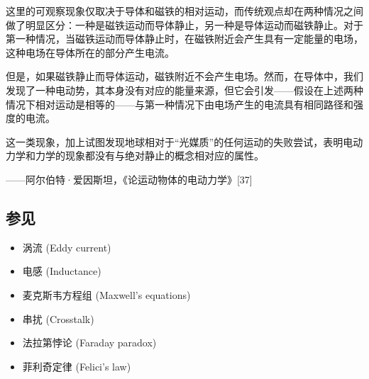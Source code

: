 这里的可观察现象仅取决于导体和磁铁的相对运动，而传统观点却在两种情况之间做了明显区分：一种是磁铁运动而导体静止，另一种是导体运动而磁铁静止。对于第一种情况，当磁铁运动而导体静止时，在磁铁附近会产生具有一定能量的电场，这种电场在导体所在的部分产生电流。

但是，如果磁铁静止而导体运动，磁铁附近不会产生电场。然而，在导体中，我们发现了一种电动势，其本身没有对应的能量来源，但它会引发——假设在上述两种情况下相对运动是相等的——与第一种情况下由电场产生的电流具有相同路径和强度的电流。

这一类现象，加上试图发现地球相对于“光媒质”的任何运动的失败尝试，表明电动力学和力学的现象都没有与绝对静止的概念相对应的属性。

——阿尔伯特·爱因斯坦，《论运动物体的电动力学》[37]
\subsection{参见}
\begin{itemize}
\item 涡流 (Eddy current)  
\item 电感 (Inductance)  
\item 麦克斯韦方程组 (Maxwell's equations)  
\item 串扰 (Crosstalk)  
\item 法拉第悖论 (Faraday paradox)  
\item 菲利奇定律 (Felici's law)  
\end{itemize}
